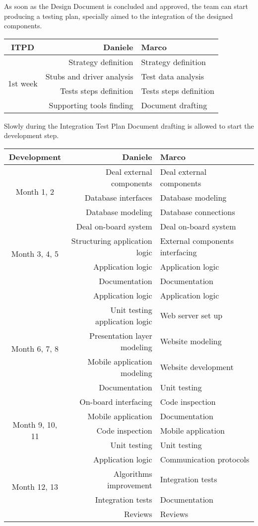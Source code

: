 \documentclass{scrreprt}
\begin{document}
As soon as the Design Document is concluded and approved, the team can start producing a testing plan, specially aimed to the integration of the designed components.

\begin{center}
\begin{tabular}{c|rl}
\toprule ITPD& \textbf{Daniele} & \textbf{Marco} \\ \midrule
\multirow{ 4}{*}{1st week}&Strategy definition&Strategy definition\\ 	 
&Stubs and driver analysis&Test data analysis\\
&Tests steps definition&Tests steps definition\\
&Supporting tools finding & Document drafting \\
\bottomrule
\end{tabular}
\end{center}

Slowly during the Integration Test Plan Document drafting is allowed to start the development step.

\begin{center}
\begin{tabular}{c|rl}
\toprule Development & \textbf{Daniele} & \textbf{Marco} \\ \midrule
\multirow{ 3}{*}{Month 1, 2}&Deal external components&Deal external components\\ 
&Database interfaces&Database modeling\\
&Database modeling&Database connections\\	 
\midrule
\multirow{ 4}{*}{Month 3, 4, 5} &Deal on-board system&Deal on-board system\\
&Structuring application logic&External components interfacing\\
&Application logic&Application logic\\
&Documentation & Documentation \\
\midrule
\multirow{ 6}{*}{Month 6, 7, 8}&Application logic&Application logic\\
&Unit testing application logic& Web server set up \\
&Presentation layer modeling&Website modeling\\
&Mobile application modeling&Website development\\
&Documentation &Unit testing \\
&On-board interfacing&Code inspection\\
\midrule
\multirow{ 3}{*}{Month 9, 10, 11}&Mobile application&Documentation\\
&Code inspection& Mobile application\\
&Unit testing &Unit testing\\
\midrule
\multirow{ 4}{*}{Month 12, 13}&Application logic&Communication protocols\\
&Algorithms improvement& Integration tests \\
&Integration tests&Documentation\\
&Reviews&Reviews\\
\bottomrule
\end{tabular}
\end{center}
\end{document}
